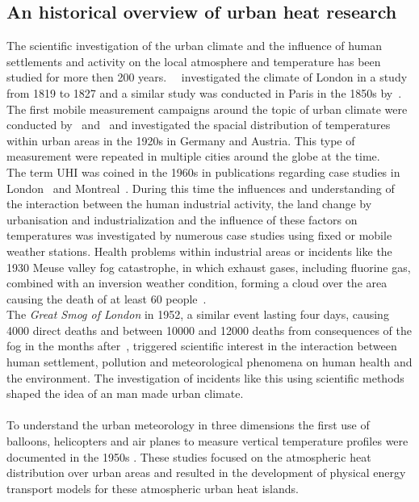 \documentclass[12pt,a4paper, english,twoside]{scrartcl}
\begin{document}
 \subsection{An historical overview of urban heat research}
  The scientific investigation of the urban climate and the influence of human settlements and activity on the local atmosphere and temperature has been studied for more then 200 years.~%
  \cite{Howard1833}~investigated the climate of London in a study from 1819 to 1827 and a similar study was conducted in Paris in the 1850s by~\cite{renou1862differences}.~%
  The first mobile measurement campaigns around the topic of urban climate were conducted by~\cite{peppler1929auto} and~\cite{tollner1932untersuchungen} and investigated the spacial distribution of temperatures within urban areas  in the 1920s in Germany and Austria. 
  This type of measurement were repeated in multiple cities around the globe at the time.\\
  The term \gls{UHI} was coined in the 1960s in publications regarding case studies in London~\autocite{Chandler1961} and Montreal~\autocite{Oke1968}.
  During this time the influences and understanding of the interaction between the human industrial activity, the land change by urbanisation and industrialization and the influence of these factors on temperatures was investigated by numerous case studies using fixed or mobile weather stations.
  Health problems within industrial areas or incidents like the 1930 Meuse valley fog catastrophe, in which exhaust gases, including fluorine gas, combined with an inversion weather condition, forming a cloud over the area causing the death of at least 60 people~\autocite{Nemery2001}.\\
%
  The \textit{Great Smog of London} in 1952, a similar event lasting four days, causing 4000 direct deaths and between 10000 and 12000 deaths from consequences of the fog in the months after~\autocite{Bell2004}, triggered scientific interest in the interaction between human settlement, pollution and meteorological phenomena on human health and the environment. 
  The investigation of incidents like this using scientific methods shaped the idea of an man made urban climate.\\ \\ 
%
  To understand the urban meteorology in three dimensions the first use of balloons, helicopters and air planes to measure vertical temperature profiles were documented in the 1950s \autocite{Duckworth1954}.
  These studies focused on the atmospheric heat distribution over urban areas and resulted in the development of physical energy transport models for these atmospheric urban heat islands.
\end{document}
